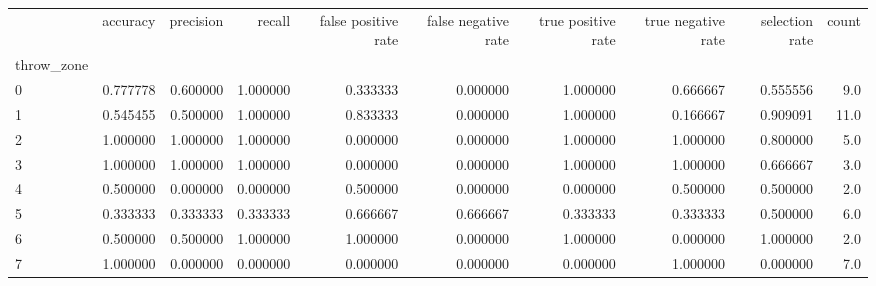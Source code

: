 \begin{tabular}{lrrrrrrrrr}
\toprule
{} &  accuracy &  precision &    recall &  false positive rate &  false negative rate &  true positive rate &  true negative rate &  selection rate &  count \\
throw\_zone &           &            &           &                      &                      &                     &                     &                 &        \\
\midrule
0          &  0.777778 &   0.600000 &  1.000000 &             0.333333 &             0.000000 &            1.000000 &            0.666667 &        0.555556 &    9.0 \\
1          &  0.545455 &   0.500000 &  1.000000 &             0.833333 &             0.000000 &            1.000000 &            0.166667 &        0.909091 &   11.0 \\
2          &  1.000000 &   1.000000 &  1.000000 &             0.000000 &             0.000000 &            1.000000 &            1.000000 &        0.800000 &    5.0 \\
3          &  1.000000 &   1.000000 &  1.000000 &             0.000000 &             0.000000 &            1.000000 &            1.000000 &        0.666667 &    3.0 \\
4          &  0.500000 &   0.000000 &  0.000000 &             0.500000 &             0.000000 &            0.000000 &            0.500000 &        0.500000 &    2.0 \\
5          &  0.333333 &   0.333333 &  0.333333 &             0.666667 &             0.666667 &            0.333333 &            0.333333 &        0.500000 &    6.0 \\
6          &  0.500000 &   0.500000 &  1.000000 &             1.000000 &             0.000000 &            1.000000 &            0.000000 &        1.000000 &    2.0 \\
7          &  1.000000 &   0.000000 &  0.000000 &             0.000000 &             0.000000 &            0.000000 &            1.000000 &        0.000000 &    7.0 \\
\bottomrule
\end{tabular}
